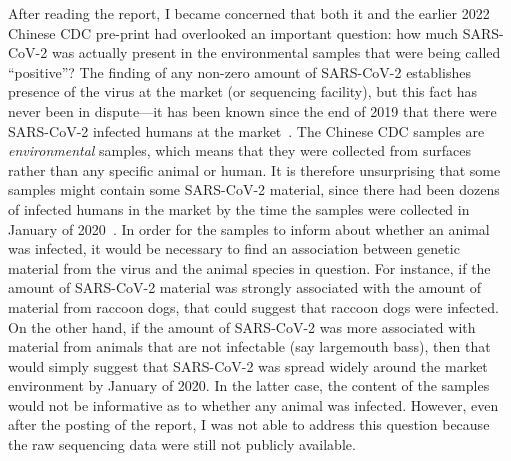 \documentclass[9pt,onecolumn,twoside]{gsajnl_modified}
\begin{document}
After reading the \citet{crits2023genetic} report, I became concerned that both it and the earlier 2022 Chinese CDC pre-print had overlooked an important question: how much SARS-CoV-2 was actually present in the environmental samples that were being called ``positive''?
The finding of any non-zero amount of SARS-CoV-2 establishes presence of the virus at the market (or sequencing facility), but this fact has never been in dispute---it has been known since the end of 2019 that there were SARS-CoV-2 infected humans at the market~\citep{ProMED2109}.
The Chinese CDC samples are \textit{environmental} samples, which means that they were collected from surfaces rather than any specific animal or human.
It is therefore unsurprising that some samples might contain some SARS-CoV-2 material, since there had been dozens of infected humans in the market by the time the samples were collected in January of 2020~\citep{huang2020clinical}.
In order for the samples to inform about whether an animal was infected, it would be necessary to find an association between genetic material from the virus and the animal species in question.
For instance, if the amount of SARS-CoV-2 material was strongly associated with the amount of material from raccoon dogs, that could suggest that raccoon dogs were infected.
On the other hand, if the amount of SARS-CoV-2 was more associated with material from animals that are not infectable (say largemouth bass), then that would simply suggest that SARS-CoV-2 was spread widely around the market environment by January of 2020.
In the latter case, the content of the samples would not be informative as to whether any animal was infected.
However, even after the posting of the \citet{crits2023genetic} report, I was not able to address this question because the raw sequencing data were still not publicly available.
\end{document}
